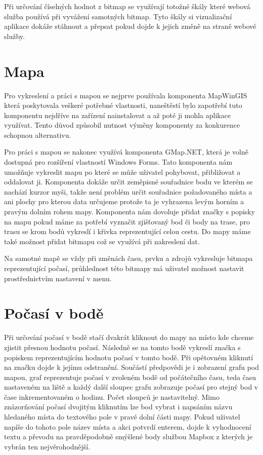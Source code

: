 \documentclass[czech,bachelor,dept460,male,csharp,cpdeclaration]{diploma}
\begin{document}
	Při určování číselných hodnot z bitmap se využívají totožné škály které webová služba používá při vyvážení samotných bitmap. Tyto škály si vizualizační aplikace dokáže stáhnout a přepsat pokud dojde k jejich změně na straně webové služby.
	
	\section{Mapa}
	
	Pro vykreslení a práci s mapou se nejprve používala komponenta MapWinGIS která poskytovala veškeré potřebné vlastnosti, naneštěstí bylo zapotřebí tuto komponentu nejdříve na zařízení nainstalovat a až poté ji mohla aplikace využívat. Tento důvod způsobil nutnost výměny komponenty za konkurence schopnou alternativu.
	
	Pro práci s mapou se nakonec využívá komponenta GMap.NET, která je volně dostupná pro rozšíření vlastností Windows Forms. Tato komponenta nám umožňuje vykreslit mapu po které se může uživatel pohybovat, přibližovat a oddalovat ji. Komponenta dokáže určit zeměpisné souřadnice bodu ve kterém se nachází kurzor myši, takže není problém určit souřadnice požadovaného místa a ani plochy pro kterou data určujeme protože ta je vyhrazena levým horním a pravým dolním rohem mapy. Komponenta nám dovoluje přidat značky s popisky na mapu pokud máme za potřebí vyznačit zjišťovaný bod či body na trase, pro trasu se krom bodů vykreslí i křivka reprezentující celou cestu. Do mapy máme také možnost přidat bitmapu což se využívá při nakreslení dat.
	
	Na samotné mapě se vždy při změnách času, prvku a zdrojů vykresluje bitmapa reprezentující počasí, průhlednost této bitmapy má uživatel možnost nastavit prostřednictvím nastavení v menu.
	
	\section{Počasí v bodě}
	
	Při určování počasí v bodě stačí dvakrát kliknout do mapy na místo kde chceme zjistit přesnou hodnotu počasí. Následně se na tomto bodě vykreslí značka s popiskem reprezentujícím hodnotu počasí v tomto bodě. Při opětovném kliknutí na značku dojde k jejímu odstranění. Součástí předpovědi je i zobrazení grafu pod mapou, graf reprezentuje počasí v zvoleném bodě od počátečního času, teda času nastaveném na liště a každý další sloupec grafu zobrazuje počasí pro stejný bod v čase inkrementovaném o hodinu. Počet sloupců je nastavitelný. Mimo znázorňování počasí dvojitým kliknutím lze bod vybrat i napsáním názvu hledaného místa do textového pole v pravé dolní části mapy. Pokud uživatel napíše do tohoto pole název místa a akci potvrdí enterem, dojde k vyhodnocení textu a převodu na pravděpodobně smýšlené body službou Mapbox \cite{mapbox} z kterých je vybrán ten nejvěrohodnější. 
	
\end{document}
